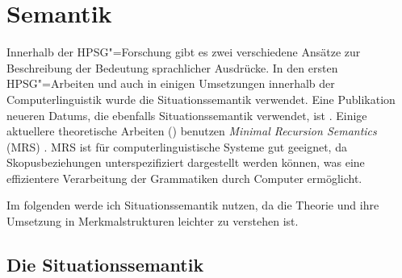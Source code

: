 
\chapter{Semantik}
\label{chap-sem}\label{Kapitel-Semantik}


Innerhalb der HPSG"=Forschung gibt es zwei verschiedene Ansätze
zur Beschreibung der Bedeutung sprachlicher Ausdrücke. In den ersten
HPSG"=Arbeiten \citep{ps,ps2,Mueller99a} und auch in einigen Umsetzungen 
innerhalb der Computerlinguistik wurde die Situationssemantik
\citep*{BP83a,CMP90,Devlin92}\nocite{BP87a} verwendet.
Eine Publikation neueren Datums, die ebenfalls Situationssemantik verwendet,
ist .
Einige aktuellere theoretische Arbeiten (\zb {}) benutzen
\emph{Minimal Recursion Semantics}
(MRS) \citep*{CFPS2005a}. MRS ist für computerlinguistische Systeme gut geeignet, da
Skopusbeziehungen unterspezifiziert dargestellt werden können, was eine effizientere
Verarbeitung der Grammatiken durch Computer ermöglicht.

Im folgenden werde ich Situationssemantik nutzen, da die Theorie und ihre
Umsetzung in Merkmalstrukturen leichter zu verstehen ist.

\section{Die Situationssemantik}

